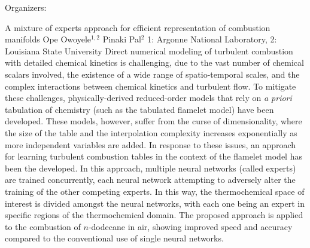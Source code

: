 \label{mini30}

\miniabs
{}
{Organizers: }
{}

\vspace{2ex}
\abs
{A mixture of experts approach for efficient representation of combustion manifolds}
{Ope Owoyele$^{1,2}$ Pinaki Pal$^2$}
{1: Argonne National Laboratory, 2: Louisiana State University}
{Direct numerical modeling of turbulent combustion with detailed chemical kinetics is challenging, due to the vast number of chemical scalars involved, the existence of a wide range of spatio-temporal scales, and the complex interactions between chemical kinetics and turbulent flow. To mitigate these challenges, physically-derived reduced-order models that rely on \textit{a priori} tabulation of chemistry (such as the tabulated flamelet model) have been developed. These models, however, suffer from the curse of dimensionality, where the size of the table and the interpolation complexity increases exponentially as more independent variables are added. In response to these issues, an approach for learning turbulent combustion tables in the context of the flamelet model has been the developed. In this approach, multiple neural networks (called experts) are trained concurrently, each neural network attempting to adversely alter the training of the other competing experts. In this way, the thermochemical space of interest is divided amongst the neural networks, with each one being an expert in specific regions of the thermochemical domain. The proposed approach is applied to the combustion of $n$-dodecane in air, showing improved speed and accuracy compared to the conventional use of single neural networks.}



